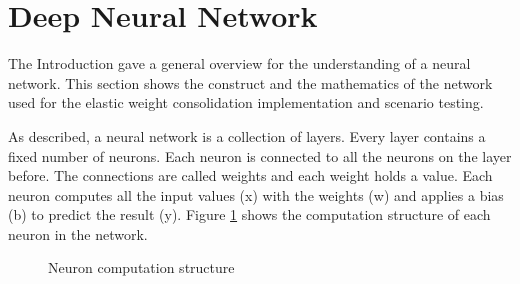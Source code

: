 \section{Deep Neural Network}
\label{foundations_deep_neural_network}

The Introduction gave a general overview for the understanding of a neural network.
This section shows the construct and the mathematics of the network used for the elastic weight consolidation implementation and scenario testing.

As described, a neural network is a collection of layers.
Every layer contains a fixed number of neurons.
Each neuron is connected to all the neurons on the layer before.
The connections are called weights and each weight holds a value.
\newline
Each neuron computes all the input values (x) with the weights (w) and applies a bias (b) to predict the result (y).
Figure \ref{fig:dnn_node_procedure} shows the computation structure of each neuron in the network.
\cite{math_nn_skalski}

\begin{figure}[H]
    \centering
    \caption{\cite{dnn_neuron_basic_overview} Neuron computation structure}
    \label{fig:dnn_node_procedure}
\end{figure}

